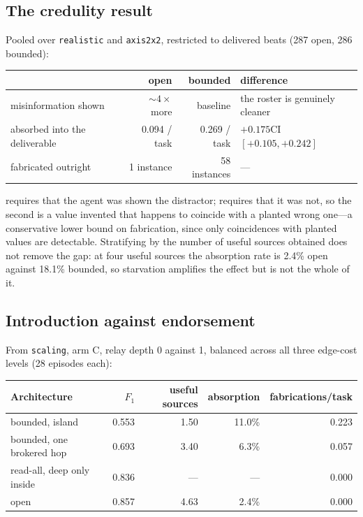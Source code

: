 \subsection{The credulity result}
\label{app:credulity}

Pooled over \texttt{realistic} and \texttt{axis2x2}, restricted to delivered beats
(287 open, 286 bounded):

\begin{center}\small
\begin{tabular}{@{}lrrl@{}}
\toprule
& \textbf{open} & \textbf{bounded} & \textbf{difference} \\
\midrule
misinformation shown           & $\sim4\times$ more & baseline & the roster is genuinely cleaner \\
absorbed into the deliverable  & 0.094 / task & 0.269 / task & $+0.175$\quad CI $[+0.105, +0.242]$ \\
fabricated outright            & 1 instance   & 58 instances & --- \\
\bottomrule
\end{tabular}
\end{center}

 requires that the agent was shown the distractor; 
requires that it was not, so the second is a value invented that happens to coincide with
a planted wrong one---a conservative lower bound on fabrication, since only coincidences
with planted values are detectable. Stratifying by the number of useful sources obtained
does not remove the gap: at four useful sources the absorption rate is 2.4\% open against
18.1\% bounded, so starvation amplifies the effect but is not the whole of it.

\subsection{Introduction against endorsement}
\label{app:relay2}

From \texttt{scaling}, arm C, relay depth 0 against 1, balanced across all three edge-cost
levels (28 episodes each):

\begin{center}\small
\begin{tabular}{@{}lrrrr@{}}
\toprule
\textbf{Architecture} & \textbf{$F_1$} & \textbf{useful sources} & \textbf{absorption} & \textbf{fabrications/task} \\
\midrule
bounded, island            & 0.553 & 1.50 & 11.0\% & 0.223 \\
bounded, one brokered hop  & 0.693 & 3.40 & 6.3\%  & 0.057 \\
read-all, deep only inside & 0.836 & --- & --- & 0.000 \\
open                       & 0.857 & 4.63 & 2.4\%  & 0.000 \\
\bottomrule
\end{tabular}
\end{center}

